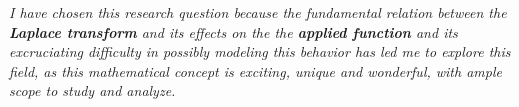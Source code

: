 \textit{I have chosen this research question because the fundamental relation between the \textbf{Laplace transform} and its effects on the the \textbf{applied function} and its excruciating difficulty in possibly modeling this behavior has led me to explore this field, as this mathematical concept is exciting, unique and wonderful, with ample scope to study and analyze.}

